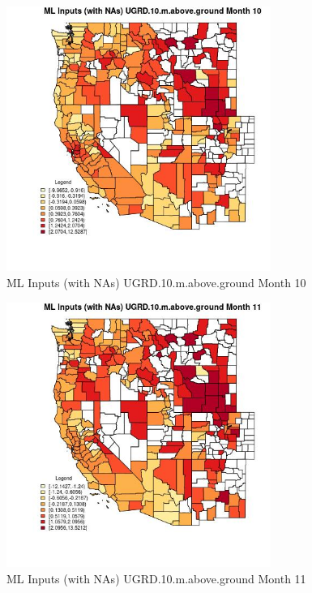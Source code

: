 \begin{figure} 
\centering  
\includegraphics[width=0.77\textwidth]{Code_Outputs/Report_ML_input_PM25_Step4_part_f_de_duplicated_aves_prioritize_24hr_obswNAs_CountyUGRD10mabovegroundmedianMonth10.jpg} 
\caption{\label{fig:Report_ML_input_PM25_Step4_part_f_de_duplicated_aves_prioritize_24hr_obswNAsCountyUGRD10mabovegroundmedianMonth10}ML Inputs (with NAs) UGRD.10.m.above.ground Month 10} 
\end{figure} 
 

\begin{figure} 
\centering  
\includegraphics[width=0.77\textwidth]{Code_Outputs/Report_ML_input_PM25_Step4_part_f_de_duplicated_aves_prioritize_24hr_obswNAs_CountyUGRD10mabovegroundmedianMonth11.jpg} 
\caption{\label{fig:Report_ML_input_PM25_Step4_part_f_de_duplicated_aves_prioritize_24hr_obswNAsCountyUGRD10mabovegroundmedianMonth11}ML Inputs (with NAs) UGRD.10.m.above.ground Month 11} 
\end{figure} 
 

